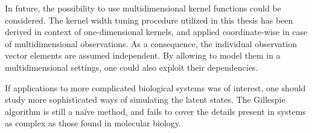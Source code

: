 In future, the possibility to use multidimensional kernel functions could be considered. The kernel width tuning procedure utilized in this thesis has been derived in context of one-dimensional kernels, and applied coordinate-wise in case of multidimensional observations. As a consequence, the individual observation vector elements are assumed independent. By allowing to model them in a multidimensional settings, one could also exploit their dependencies.

If applications to more complicated biological systems was of interest, one should study more sophisticated ways of simulating the latent states. The Gillespie algorithm is still a naïve method, and fails to cover the details present in systems as complex as those found in molecular biology.